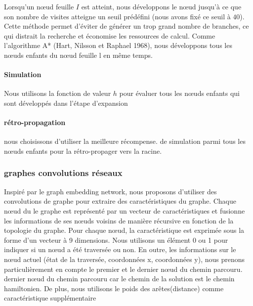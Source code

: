 \documentclass[]{article}
\let\oldparagraph\paragraph
\renewcommand{\paragraph}[1]{\oldparagraph{#1}\mbox{}}
\begin{document}
Lorsqu'un nœud feuille \(I\) est atteint, nous développons le nœud
jusqu'à ce que son nombre de visites atteigne un seuil prédéfini (nous
avons fixé ce seuil à \(40\)). Cette méthode permet d'éviter de générer
un trop grand nombre de branches, ce qui distrait la recherche et
économise les ressources de calcul. Comme l'algorithme A* (Hart, Nilsson
et Raphael 1968), nous développons tous les nœuds enfants du nœud
feuille l en même temps.

\hypertarget{simulation-2}{%
\paragraph{Simulation}\label{simulation-2}}

Nous utilisons la fonction de valeur \(h\) pour évaluer tous les nœuds
enfants qui sont développés dans l'étape d'expansion

\hypertarget{ruxe9tro-propagation}{%
\paragraph{rétro-propagation}\label{ruxe9tro-propagation}}

nous choisissons d'utiliser la meilleure récompense. de simulation parmi
tous les nœuds enfants pour la rétro-propager vers la racine.

\hypertarget{graphes-convolutions-ruxe9seaux}{%
\subsubsection{graphes convolutions
réseaux}\label{graphes-convolutions-ruxe9seaux}}

Inspiré par le graph embedding network, nous proposons d'utiliser des
convolutions de graphe pour extraire des caractéristiques du graphe.
Chaque nœud du le graphe est représenté par un vecteur de
caractéristiques et fusionne les informations de ses nœuds voisins de
manière récursive en fonction de la topologie du graphe. Pour chaque
nœud, la caractéristique est exprimée sous la forme d'un vecteur à 9
dimensions. Nous utilisons un élément 0 ou 1 pour indiquer si un nœud a
été traversée ou non. En outre, les informations sur le nœud actuel
(état de la traversée, coordonnées x, coordonnées y), nous prenons
particulièrement en compte le premier et le dernier nœud du chemin
parcouru. dernier nœud du chemin parcouru car le chemin de la solution
est le chemin hamiltonien. De plus, nous utilisons le poids des
arêtes(distance) comme caractéristique supplémentaire
\end{document}
